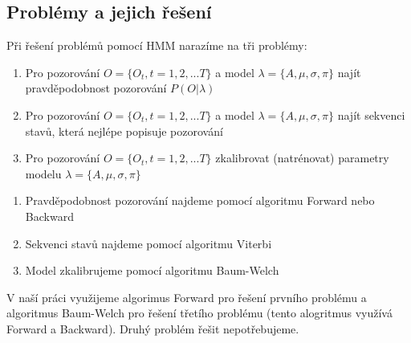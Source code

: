 \subsection{Problémy a jejich řešení}
Při řešení problémů pomocí HMM narazíme na tři problémy:
\begin{enumerate}
    \item Pro pozorování \(O = \{O_t,t=1,2,...T\}\) a model \(\lambda = \{A,\mu,\sigma,\pi\}\) najít pravděpodobnost pozorování \(P(O|\lambda)\)
    \item Pro pozorování \(O = \{O_t,t=1,2,...T\}\) a model \(\lambda = \{A,\mu,\sigma,\pi\}\)
    najít sekvenci stavů, která nejlépe popisuje pozorování
    \item Pro pozorování \(O = \{O_t,t=1,2,...T\}\) zkalibrovat (natrénovat) parametry modelu \(\lambda = \{A,\mu,\sigma,\pi\}\)
\end{enumerate}
\begin{enumerate}
    \item Pravděpodobnost pozorování najdeme pomocí algoritmu Forward nebo Backward
    \item Sekvenci stavů najdeme pomocí algoritmu Viterbi
    \item Model zkalibrujeme pomocí algoritmu Baum-Welch
\end{enumerate}

V naší práci využijeme algorimus Forward pro řešení prvního problému a algoritmus Baum-Welch pro řešení třetího
problému (tento alogritmus využívá Forward a Backward). Druhý problém řešit nepotřebujeme.

\clearpage
